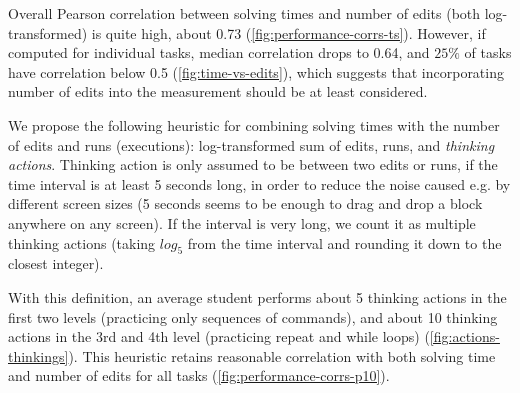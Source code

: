 Overall Pearson correlation between solving times and number of edits (both
log-transformed) is quite high, about 0.73 (\cref{fig:performance-corrs-ts}).
However, if computed for individual tasks,
median correlation drops to 0.64, %
and $25\%$ of tasks have correlation below 0.5 %
(\cref{fig:time-vs-edits}), which suggests that incorporating number of edits into the
measurement should be at least considered.

We propose the following heuristic for combining solving times with the number
of edits and runs (executions): log-transformed sum of edits, runs, and \emph{thinking
actions}.
Thinking action is only assumed to be between two edits or runs, if the time interval
is at least 5 seconds long, in order to reduce the noise caused e.g. by
different screen sizes
(5 seconds seems to be enough to drag and drop a block anywhere on any screen).
If the interval is very long,
we count it as multiple thinking actions (taking $log_5$ from the time interval
and rounding it down to the closest integer).

With this definition, an average student performs about 5 thinking actions
in the first two levels (practicing only sequences of commands),
and about 10 thinking actions in the 3rd and 4th level (practicing repeat and while loops)
(\cref{fig:actions-thinkings}).
This heuristic retains reasonable correlation with both solving time
and number of edits for all tasks (\cref{fig:performance-corrs-p10}).



